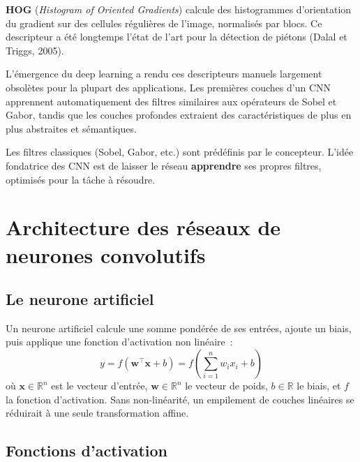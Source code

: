 \documentclass[a4paper,11pt,twoside]{book}
\newcommand{\R}{\mathbb{R}}
\newcommand{\vect}[1]{\boldsymbol{#1}}
\begin{document}
\textbf{HOG} (\textit{Histogram of Oriented Gradients}) calcule des histogrammes d'orientation du gradient sur des cellules régulières de l'image, normalisés par blocs. Ce descripteur a été longtemps l'état de l'art pour la détection de piétons (Dalal et Triggs, 2005).

L'émergence du deep learning a rendu ces descripteurs manuels largement obsolètes pour la plupart des applications. Les premières couches d'un CNN apprennent automatiquement des filtres similaires aux opérateurs de Sobel et Gabor, tandis que les couches profondes extraient des caractéristiques de plus en plus abstraites et sémantiques.

\begin{notebox}[Transition]
Les filtres classiques (Sobel, Gabor, etc.) sont prédéfinis par le concepteur. L'idée fondatrice des CNN est de laisser le réseau \textbf{apprendre} ses propres filtres, optimisés pour la tâche à résoudre.
\end{notebox}


\chapter{Architecture des réseaux de neurones convolutifs}

\section{Le neurone artificiel}

Un neurone artificiel calcule une somme pondérée de ses entrées, ajoute un biais, puis applique une fonction d'activation non linéaire~:
\[
y = f\!\left(\vect{w}^\top \vect{x} + b\right) = f\!\left(\sum_{i=1}^{n} w_i x_i + b\right)
\]
où $\vect{x} \in \R^n$ est le vecteur d'entrée, $\vect{w} \in \R^n$ le vecteur de poids, $b \in \R$ le biais, et $f$ la fonction d'activation. Sans non-linéarité, un empilement de couches linéaires se réduirait à une seule transformation affine.

\section{Fonctions d'activation}
\end{document}

